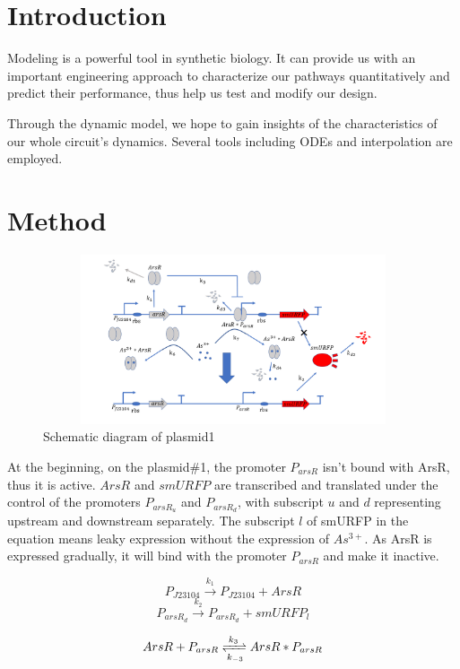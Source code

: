 \section{Introduction}
Modeling is a powerful tool in synthetic biology. It can provide us with an important engineering approach to characterize our pathways quantitatively and predict their performance, thus help us test and modify our design.

Through the dynamic model, we hope to gain insights of the characteristics of our whole circuit's dynamics. Several tools including ODEs and interpolation are employed.


\section{Method}

\begin{figure}[h]
\centering
\includegraphics[width=12cm,height=5cm]{1}
\caption{Schematic diagram of plasmid1}
\end{figure}

At the beginning, on the plasmid\#1, the promoter $P_{arsR}$ isn't bound with ArsR, thus it is active. $ArsR$ and $smURFP$ are transcribed and translated under the control of the promoters $P_{arsR_u}$ and $P_{arsR_d}$, with subscript $u$ and $d$ representing upstream and downstream separately. The subscript $l$ of smURFP in the equation means leaky expression without the expression of $As^{3+}$. As ArsR is expressed gradually, it will bind with the promoter $P_{arsR}$ and make it inactive. 

\begin{equation}
P_{J23104} \stackrel{k_1}{\longrightarrow} P_{J23104}+ArsR
\end{equation}
\begin{equation}
P_{arsR_d} \stackrel{k_2}{\longrightarrow} P_{arsR_d} +smURFP_l
\end{equation}

\begin{equation}
ArsR+P_{arsR} \xrightleftharpoons[k_{-3}]{k_3}ArsR*P_{arsR} 
\end{equation} 

